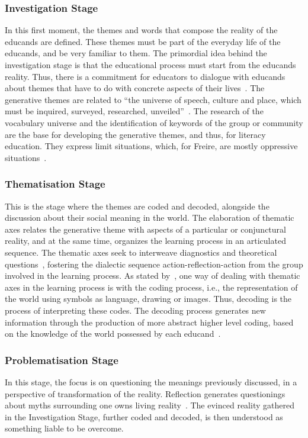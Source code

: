 \subsubsection{Investigation Stage}
In this first moment, the themes and words that compose the reality of the educands are defined. These themes must be part of the everyday life of the educands, and be very familiar to them. The primordial idea behind the investigation stage is that the educational process must start from the educands reality. Thus, there is a commitment for educators to dialogue with educands about themes that have to do with concrete aspects of their lives~\cite{Corazza2003}. 
The generative themes are related to ``the universe of speech, culture and place, which must be inquired, surveyed, researched, unveiled''~\cite{Brandao1985}.
The research of the vocabulary universe and the identification of keywords of the group or community are the base for developing the generative themes, and thus, for literacy education.
They express limit situations, which, for Freire, are mostly oppressive situations~\cite{Corazza2003}.

\subsubsection{Thematisation Stage}
This is the stage where the themes are coded and decoded, alongside the discussion about their social meaning in the world. The elaboration of thematic axes relates the generative theme with aspects of a particular or conjunctural reality, and at the same time, organizes the learning process in an articulated sequence. The thematic axes seek to interweave diagnostics and theoretical questions~\cite{Nunez1998}, fostering the dialectic sequence action-reflection-action from the group involved in the learning process. As stated by~\cite{Freire2005}, one way of dealing with thematic axes in the learning process is with the coding process, i.e., the representation of the world using symbols as language, drawing or images. Thus, decoding is the process of interpreting these codes. The decoding process generates new information through the production of more abstract higher level coding, based on the knowledge of the world possessed by each educand~\cite{Barato1984}.

\subsubsection{Problematisation Stage}
In this stage, the focus is on questioning the meanings previously discussed, in a perspective of transformation of the reality. Reflection generates questionings about myths surrounding one owns living reality~\cite{Freire1979}.  The evinced reality gathered in the Investigation Stage, further coded and decoded, is then understood as something liable to be overcome. 

